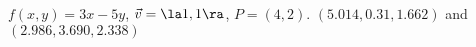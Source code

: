 {$f(x,y) = 3x-5y$,  $\vec v = \la 1,1\ra$, $P=(4,2)$.
}
{
$(5.014, 0.31, 1.662)$ and $(2.986, 3.690, 2.338)$ 
}